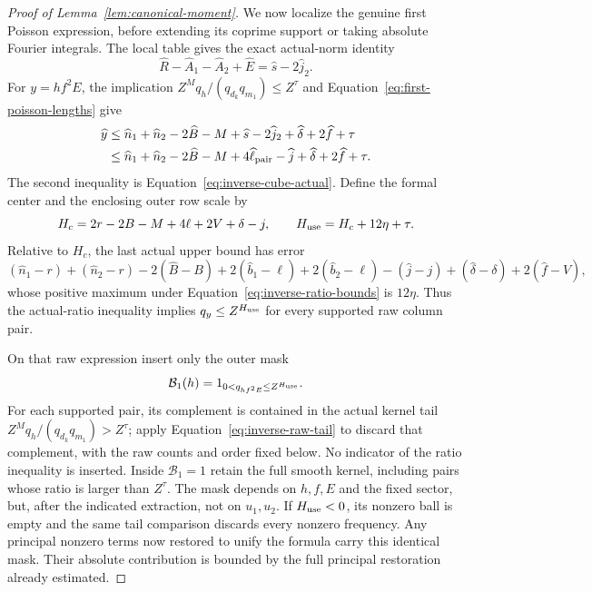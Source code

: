 \documentclass[11pt,a4paper]{article}
\numberwithin{equation}{section}
\numberwithin{figure}{section}
\theoremstyle{definition}
\theoremstyle{remark}
\begin{document}
\begin{proof}[Proof of Lemma~\ref{lem:canonical-moment}]
We now localize the genuine first Poisson expression, before extending its
coprime support or taking absolute Fourier integrals.  The local table gives
the exact actual-norm identity
\[
 \widehat R-\widehat A_1-\widehat A_2+\widehat E
       =\widehat s-2\widehat j_2.
\]
For \(y=hf^2E\), the implication
\(Z^Mq_h/(q_{d_k}q_{m_1})\le Z^\tau\) and
Equation~\eqref{eq:first-poisson-lengths} give
\[
 \begin{split}
 \widehat y
 &\le \widehat n_1+\widehat n_2-2\widehat B-M
       +\widehat s-2\widehat j_2+\widehat\delta+2\widehat f+\tau\\
 &\le \widehat n_1+\widehat n_2-2\widehat B-M
       +4\widehat\ell_{\rm pair}-\widehat j
       +\widehat\delta+2\widehat f+\tau.
 \end{split}
\]
The second inequality is Equation~\eqref{eq:inverse-cube-actual}.
Define the formal center and the enclosing outer row scale by
\begin{equation}\label{eq:enlarged-first-frequency}
 H_c=2r-2B-M+4\ell+2V+\delta-j,\qquad
 H_{\rm use}=H_c+12\eta+\tau.
\end{equation}
Relative to \(H_c\), the last actual upper bound has error
\[
 (\widehat n_1-r)+(\widehat n_2-r)-2(\widehat B-B)
 +2(\widehat b_1-\ell)+2(\widehat b_2-\ell)
 -(\widehat j-j)+(\widehat\delta-\delta)+2(\widehat f-V),
\]
whose positive maximum under Equation~\eqref{eq:inverse-ratio-bounds} is
\(12\eta\).  Thus the actual-ratio inequality implies
\(q_y\le Z^{H_{\rm use}}\) for every supported raw column pair.

On that raw expression insert only the outer mask
\[
 \mathcal B_1(h)=1_{0<q_{hf^2E}\le Z^{H_{\rm use}}}.
\]
For each supported pair, its complement is contained in the actual kernel
tail \(Z^Mq_h/(q_{d_k}q_{m_1})>Z^\tau\); apply
Equation~\eqref{eq:inverse-raw-tail} to discard that complement, with the
raw counts and order fixed below.  No indicator of the ratio inequality
is inserted.  Inside \(\mathcal B_1=1\) retain the full smooth kernel,
including pairs whose ratio is larger than \(Z^\tau\).  The mask depends
on \(h,f,E\) and the fixed sector, but, after the indicated extraction,
not on \(u_1,u_2\).  If \(H_{\rm use}<0\), its nonzero ball is empty and
the same tail comparison discards every nonzero frequency.  Any principal
nonzero terms now restored to unify the formula carry this identical mask.
Their absolute contribution is bounded by the full principal restoration
already estimated.


\end{proof}
\end{document}
